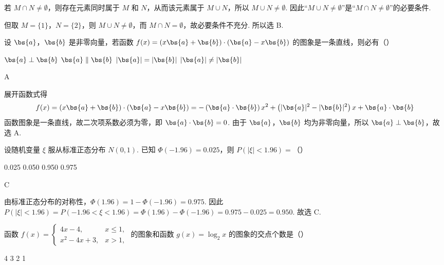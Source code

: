 \begin{solution}
若 \(M\cap N\neq\emptyset\)，则存在元素同时属于 \(M\) 和 \(N\)，从而该元素属于 \(M\cup N\)，所以 \(M\cup N\neq\emptyset\). 因此“\(M\cup N\neq\emptyset\)”是“\(M\cap N\neq\emptyset\)”的必要条件.

但取 \(M=\{1\}\)，\(N=\{2\}\)，则 \(M\cup N\neq\emptyset\)，而 \(M\cap N=\emptyset\)，故必要条件不充分. 所以选 B.
\end{solution}

\begin{problem}
设 \(\bs{a}\)，\(\bs{b}\) 是非零向量，若函数 \(f(x) = (x\bs{a} + \bs{b}) \cdot (\bs{a} - x\bs{b})\) 的图象是一条直线，则必有（\quad）

\choices
    {\(\bs{a} \perp \bs{b}\)}
    {\(\bs{a} \parallel \bs{b}\)}
    {\( |\bs{a}| = |\bs{b}| \)}
    {\( |\bs{a}| \neq |\bs{b}| \)}
\end{problem}

\begin{answer}
A
\end{answer}

\begin{solution}
展开函数式得
\[
f(x)=(x\bs{a}+\bs{b})\cdot(\bs{a}-x\bs{b})=-\left(\bs{a}\cdot\bs{b}\right)x^2+\left(|\bs{a}|^2-|\bs{b}|^2\right)x+\bs{a}\cdot\bs{b}
\]
函数图象是一条直线，故二次项系数必须为零，即 \(\bs{a}\cdot\bs{b}=0\). 由于 \(\bs{a}\)，\(\bs{b}\) 均为非零向量，所以 \(\bs{a}\perp\bs{b}\)，故选 A.
\end{solution}

\begin{problem}
设随机变量 \(\xi\) 服从标准正态分布 \(N(0,1)\). 已知 \(\Phi(-1.96) = 0.025\)，则 \(P(|\xi| < 1.96) =\)（\quad）

\choices
    {0.025}
    {0.050}
    {0.950}
    {0.975}
\end{problem}

\begin{answer}
C
\end{answer}

\begin{solution}
由标准正态分布的对称性，\(\Phi(1.96)=1-\Phi(-1.96)=0.975\). 因此
\(P(|\xi|<1.96)=P(-1.96<\xi<1.96)=\Phi(1.96)-\Phi(-1.96)=0.975-0.025=0.950\).
故选 C.
\end{solution}

\begin{problem}
函数 \( f(x) = \begin{cases}
4x - 4, & x \leqslant 1,\\
x^2 - 4x + 3, & x > 1,
\end{cases} \) 的图象和函数 \( g(x) = \log_2 x \) 的图象的交点个数是（\quad）

\choices
    {4}
    {3}
    {2}
    {1}
\end{problem}

